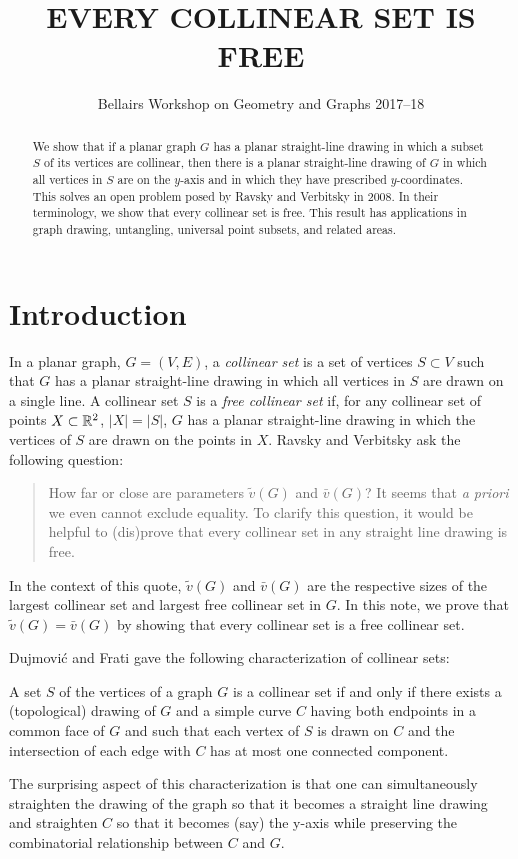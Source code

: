 \documentclass{patmorin}
\title{\MakeUppercase{Every Collinear Set is Free}}
\author{Bellairs Workshop on Geometry and Graphs 2017--18}
\begin{document}
\maketitle


\begin{abstract}
  We show that if a planar graph $G$ has a planar straight-line drawing
  in which a subset $S$ of its vertices are collinear, then there is a
  planar straight-line drawing of $G$ in which all vertices in $S$ are
  on the $y$-axis and in which they have prescribed $y$-coordinates.
  This solves an open problem posed by Ravsky and Verbitsky in 2008.
  In their terminology, we show that every collinear set is free.
  This result has applications in graph drawing, untangling, universal
  point subsets, and related areas.
\end{abstract}


\section{Introduction}

In a planar graph, $G=(V,E)$, a \emph{collinear set} is a set of vertices
$S\subset V$ such that $G$ has a planar straight-line drawing in which
all vertices in $S$ are drawn on a single line.  A collinear set $S$
is a \emph{free collinear set} if, for any collinear set of points
$X\subset\mathbb{R}^2$, $|X|=|S|$, $G$ has a planar straight-line drawing in
which the vertices of $S$ are drawn on the points in $X$.  Ravsky and
Verbitsky \cite{ravsky.verbitsky:on} ask the following question:

\begin{quote}
   How far or close are parameters $\tilde{v}(G)$ and $\bar{v}(G)$? It
   seems that \emph{a priori} we even cannot exclude equality. To clarify
   this question, it would be helpful to (dis)prove that every collinear
   set in any straight line drawing is free.
\end{quote}

In the context of this quote, $\tilde{v}(G)$ and $\bar{v}(G)$ are the
respective sizes of the largest collinear set and largest free collinear
set in $G$.  In this note, we prove that $\tilde{v}(G)=\bar{v}(G)$ by
showing that every collinear set is a free collinear set.  

Dujmovi\'c and Frati gave the following characterization of collinear sets:
\begin{thm}
   A set $S$ of the vertices of a graph $G$ is a collinear set if and
   only if there exists a (topological) drawing of $G$ and a simple curve
   $C$ having both endpoints in a common face of $G$ and such that each
   vertex of $S$ is drawn on $C$ and the intersection of each edge with
   $C$ has at most one connected component.
\end{thm}
The surprising aspect of this characterization is that one can
simultaneously straighten the drawing of the graph so that it becomes a
straight line drawing and straighten $C$ so that it becomes
(say) the y-axis while preserving the combinatorial relationship between
$C$ and $G$.
\end{document}
